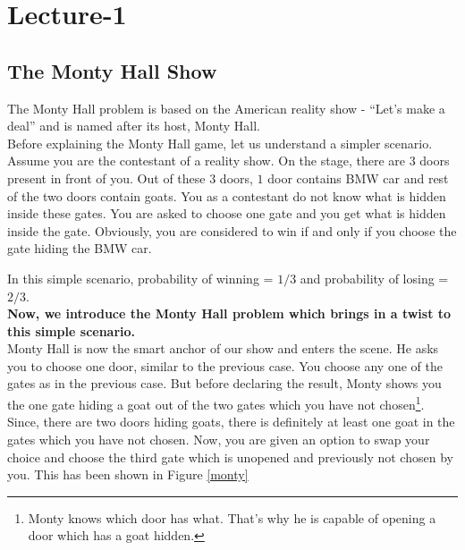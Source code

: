 \documentclass[11pt,fleqn]{book} %
\begin{document}

\chapter{Lecture-1}
\section{The Monty Hall Show}

The Monty Hall problem is based on the American reality show - ``Let's make a deal'' and is named after its host, Monty Hall. \\

Before explaining the Monty Hall game, let us understand a simpler scenario. Assume you are the contestant of a reality show. On the stage, there are $3$ doors present in front of you. Out of these $3$ doors, $1$ door contains BMW car and rest of the two doors contain goats. You as a contestant do not know what is hidden inside these gates. You are asked to choose one gate and you get what is hidden inside the gate. Obviously, you are considered to win if and only if you choose the gate hiding the BMW car.  

In this simple scenario, probability of winning = $1/3$ and probability of losing = $2/3$.\\

\textbf{Now, we introduce the Monty Hall problem which brings in a twist to this simple scenario.}\\

Monty Hall is now the smart anchor of our show and enters the scene. He asks you to choose one door, similar to the previous case. You choose any one of the gates as in the previous case. But before declaring the result, Monty shows you the one gate hiding a goat out of the two gates which you have not chosen\footnote{Monty knows which door has what. That's why he is capable of opening a door which has a goat hidden.}. Since, there are two doors hiding goats, there is definitely at least one goat in the gates which you have not chosen. Now, you are given an option to swap your choice and choose the third gate which is unopened and previously not chosen by you. This has been shown in Figure \ref{monty} \\
\end{document}
